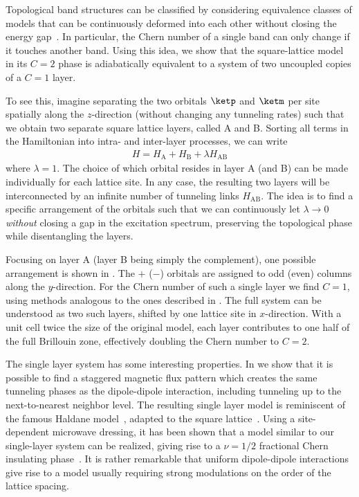 Topological band structures can be classified by considering equivalence classes of models that can be continuously deformed into each other without closing the energy gap~\cite{Hasan2010}.
In particular, the Chern number of a single band can only change if it touches another band.
Using this idea, we show that the square-lattice model in its $C=2$ phase is adiabatically equivalent to a system of two uncoupled copies of a $C=1$ layer.

To see this, imagine separating the two orbitals $\ketp$ and $\ketm$ per site spatially along the $z$-direction (without changing any tunneling rates) such that we obtain two separate square lattice layers, called A and B.
Sorting all terms in the Hamiltonian into intra- and inter-layer processes, we can write
\begin{align}
H=H_\text{A} + H_\text{B} + \lambda H_\text{AB}
\end{align}
where $\lambda=1$.
The choice of which orbital resides in layer A (and B) can be made individually for each lattice site.
In any case, the resulting two layers will be interconnected by an infinite number of tunneling links $H_\text{AB}$.
The idea is to find a specific arrangement of the orbitals such that we can continuously let $\lambda \longrightarrow 0$ \emph{without} closing a gap in the excitation spectrum, preserving the topological phase while disentangling the layers.

Focusing on layer A (layer B being simply the complement), one possible arrangement is shown in .
The ${+}$ (${-}$) orbitals are assigned to odd (even) columns along the $y$-direction.
For the Chern number of such a single layer we find $C=1$, using methods analogous to the ones described in .
The full system can be understood as two such layers, shifted by one lattice site in $x$-direction.
With a unit cell twice the size of the original model, each layer contributes to one half of the full Brillouin zone, effectively doubling the Chern number to $C=2$.

The single layer system has some interesting properties.
In  we show that it is possible to find a staggered magnetic flux pattern which creates the same tunneling phases as the dipole-dipole interaction, including tunneling up to the next-to-nearest neighbor level.
The resulting single layer model is reminiscent of the famous Haldane model~\cite{Haldane1988}, adapted to the square lattice~\cite{Goldman2013,Li2008,Liu2010,Liu2011,Stanescu2010,Wang2011,Wang2014,Yao2012,Yao2013}.
Using a site-dependent microwave dressing, it has been shown that a model similar to our single-layer system can be realized, giving rise to a $\nu=1/2$ fractional Chern insulating phase~\cite{Yao2012,Yao2013}.
It is rather remarkable that uniform dipole-dipole interactions give rise to a model usually requiring strong modulations on the order of the lattice spacing.

